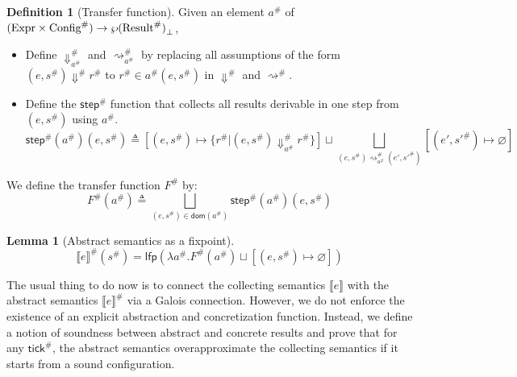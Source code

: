 \documentclass[acmsmall,screen,review]{acmart}
\theoremstyle{definition}
\newtheorem{definition}{Definition}[section]
\newtheorem{lem}{Lemma}[section]
\newcommand*{\A}[1]{{#1}^{\#}}
\newcommand*{\Expr}{\text{Expr}}
\newcommand*{\Time}{\mathbb{T}}
\newcommand*{\ATime}{\A{\Time}}
\newcommand*{\AConfig}[1]{\A{\text{Config}}\vphantom{#1}}
\newcommand*{\AResult}[1]{\A{\text{Result}}\vphantom{#1}}
\newcommand*{\sembracket}[1]{\lBrack{#1}\rBrack}
\newcommand*{\tick}{\mathsf{tick}}
\begin{document}
\begin{definition}[Transfer function]
  Given an element $\A{a}$ of $(\Expr\times\AConfig{\ATime})\rightarrow{\wp(\AResult{\ATime})}_{\bot}$,

  \begin{itemize}
    \item Define $\A{\Downarrow}_{\A{a}}$ and $\A{\rightsquigarrow}_{\A{a}}$ by replacing all assumptions of the form $(e,\A{s})\A\Downarrow\A{r}$ to $\A{r}\in\A{a}(e,\A{s})$ in $\A\Downarrow$ and $\A\rightsquigarrow$.
    \item Define the $\A{\mathsf{step}}$ function that collects all results derivable in one step from $(e,\A{s})$ using $\A{a}$.
          \[
            \A{\mathsf{step}}(\A{a})(e,\A{s})\triangleq
            [(e,\A{s})\mapsto\{\A{r}|(e,\A{s})\A{\Downarrow}_{\A{a}}\A{r}\}]
            \sqcup
            \bigsqcup_{(e,\A{s})\A{\rightsquigarrow}_{\A{a}}(e',\A{s'})}[(e',\A{s'})\mapsto\varnothing]
          \]
  \end{itemize}

  We define the transfer function $\A{F}$ by:
  \[
    \A{F}(\A{a})\triangleq
    \bigsqcup_{(e,\A{s})\in\mathsf{dom}(\A{a})}
    {\A{\mathsf{step}}(\A{a})(e,\A{s})}
  \]
\end{definition}

\begin{lem}[Abstract semantics as a fixpoint]
  \[
    \A{\sembracket{e}}(\A{s})=\mathsf{lfp}(\lambda \A{a}.\A{F}(\A{a})\sqcup[(e,\A{s})\mapsto\varnothing])
  \]
\end{lem}

The usual thing to do now is to connect the collecting semantics $\sembracket{e}$ with the abstract semantics $\A{\sembracket{e}}$ via a Galois connection.
However, we do not enforce the existence of an explicit abstraction and concretization function.
Instead, we define a notion of soundness between abstract and concrete results and prove that for any $\A{\tick}$, the abstract semantics overapproximate the collecting semantics if it starts from a sound configuration.
\end{document}
